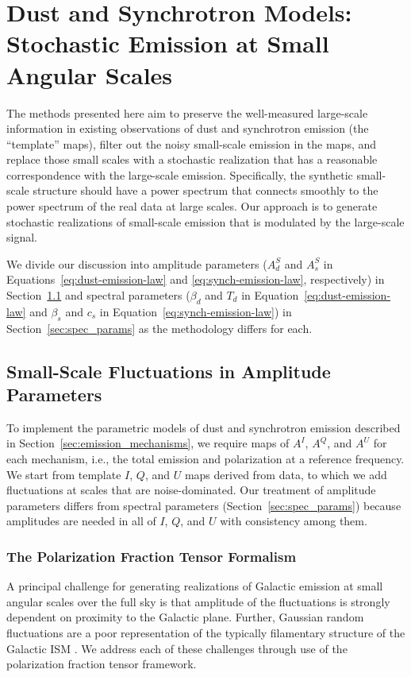\documentclass[twocolumn]{aastex631}
\begin{document}
\section{Dust and Synchrotron Models: Stochastic Emission at Small Angular Scales} \label{sec:small_scales}
The methods presented here aim to preserve the well-measured large-scale information in existing observations of dust and synchrotron emission (the ``template'' maps), filter out the noisy small-scale emission in the maps, and replace those small scales with a stochastic realization that has a reasonable correspondence with the large-scale emission. Specifically, the synthetic small-scale structure should have a power spectrum that connects smoothly to the power spectrum of the real data at large scales. Our approach is to generate stochastic realizations of small-scale emission that is modulated by the large-scale signal.

We divide our discussion into amplitude parameters ($A_d^S$ and $A_s^S$ in Equations~\ref{eq:dust-emission-law} and \ref{eq:synch-emission-law}, respectively) in Section~\ref{sec:amp_params} and spectral parameters ($\beta_d$ and $T_d$ in Equation~\ref{eq:dust-emission-law} and $\beta_s$ and $c_s$ in Equation~\ref{eq:synch-emission-law}) in Section~\ref{sec:spec_params} as the methodology differs for each.

\subsection{Small-Scale Fluctuations in Amplitude Parameters} \label{sec:amp_params}
To implement the parametric models of dust and synchrotron emission described in Section~\ref{sec:emission_mechanisms}, we require maps of $A^I$, $A^Q$, and $A^U$ for each mechanism, i.e., the total emission and polarization at a reference frequency. We start from template $I$, $Q$, and $U$ maps derived from data, to which we add fluctuations at scales that are noise-dominated. Our treatment of amplitude parameters differs from spectral parameters (Section~\ref{sec:spec_params}) because amplitudes are needed in all of $I$, $Q$, and $U$ with consistency among them.

\subsubsection{The Polarization Fraction Tensor Formalism} \label{sec:polfrac}
A principal challenge for generating realizations of Galactic emission at small angular scales over the full sky is that amplitude of the fluctuations is strongly dependent on proximity to the Galactic plane. Further, Gaussian random fluctuations are a poor representation of the typically filamentary structure of the Galactic ISM \citep[e.g.,][]{Hacar:2023}. We address each of these challenges through use of the polarization fraction tensor framework.
\end{document}
